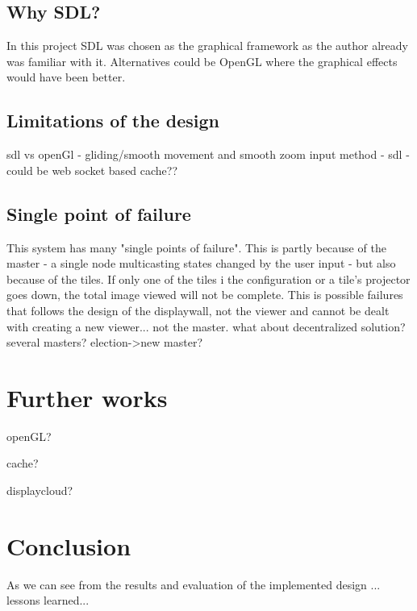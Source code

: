\documentclass[12pt, a4paper, oneside]{article}
\begin{document}
\subsection{Why SDL?}
In this project SDL was chosen as the graphical framework as the author already was familiar with it. Alternatives could be OpenGL where the graphical effects would have been better. 

\subsection{Limitations of the design}
sdl vs openGl - gliding/smooth movement and smooth zoom
input method - sdl - could be web socket based
cache??

\subsection{Single point of failure}
This system has many "single points of failure". This is partly because of the master - a single node multicasting states changed by the user input - but also because of the tiles. If only one of the tiles i the configuration or a tile's projector goes down, the total image viewed will not be complete. This is possible failures that follows the design of the displaywall, not the viewer and cannot be dealt with creating a new viewer...
not the master. what about decentralized solution? several masters? election->new master?
\newpage
\section{Further works}
openGL?

cache?

displaycloud?

\newpage
\section{Conclusion}
As we can see from the results and evaluation of the implemented design ...
lessons learned...

\newpage




\end{document}
